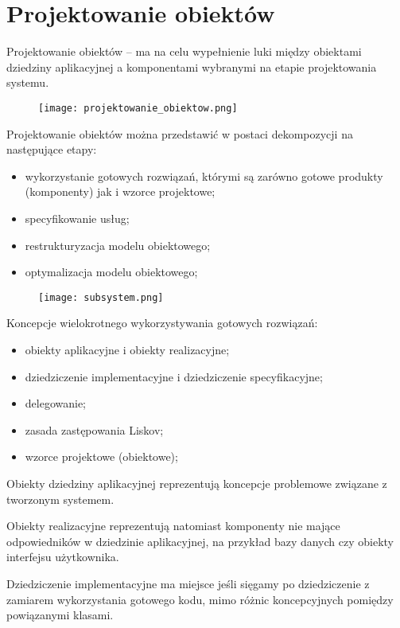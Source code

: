 \documentclass[a4paper]{article}
\begin{document}
 \section{Projektowanie obiektów}
Projektowanie obiektów – ma na celu wypełnienie luki między obiektami
dziedziny aplikacyjnej a komponentami wybranymi na etapie projektowania systemu.


\begin{figure}[h]
    \texttt{[image: projektowanie\_obiektow.png]}
\end{figure}

Projektowanie obiektów można przedstawić w
postaci dekompozycji na następujące etapy:
\begin{itemize}
    \item wykorzystanie gotowych rozwiązań, którymi są zarówno
gotowe produkty (komponenty) jak i wzorce projektowe;
\item specyfikowanie usług;
\item restrukturyzacja modelu obiektowego;
\item optymalizacja modelu obiektowego;
\end{itemize}

\begin{figure}[h]
    \texttt{[image: subsystem.png]}
\end{figure}

Koncepcje wielokrotnego wykorzystywania
gotowych rozwiązań:
\begin{itemize}
    \item obiekty aplikacyjne i obiekty realizacyjne;
    \item dziedziczenie implementacyjne i dziedziczenie
specyfikacyjne;
    \item delegowanie;
    \item zasada zastępowania Liskov;
    \item wzorce projektowe (obiektowe);
\end{itemize}

Obiekty dziedziny aplikacyjnej reprezentują
koncepcje problemowe związane z tworzonym
systemem.

Obiekty realizacyjne reprezentują natomiast
komponenty nie mające odpowiedników w
dziedzinie aplikacyjnej, na przykład bazy danych
czy obiekty interfejsu użytkownika.

Dziedziczenie implementacyjne ma miejsce jeśli
sięgamy po dziedziczenie z zamiarem wykorzystania
gotowego kodu, mimo różnic koncepcyjnych
pomiędzy powiązanymi klasami.
\end{document}

